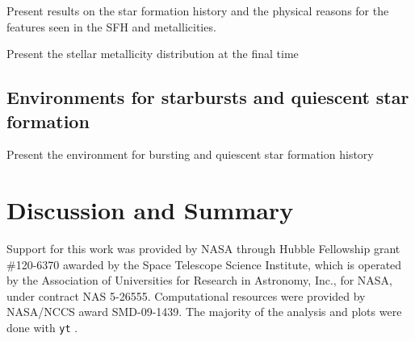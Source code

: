 \documentclass[apjl]{emulateapj}
\begin{document}
\li Present results on the star formation history and the physical
reasons for the features seen in the SFH and metallicities.

\li Present the stellar metallicity distribution at the final time

\subsection{Environments for starbursts and quiescent star formation}

\li Present the environment for bursting and quiescent star formation
history

\section{Discussion and Summary}

\acknowledgments

Support for this work was provided by NASA through Hubble Fellowship
grant \#120-6370 awarded by the Space Telescope Science Institute,
which is operated by the Association of Universities for Research in
Astronomy, Inc., for NASA, under contract NAS 5-26555.  Computational
resources were provided by NASA/NCCS award SMD-09-1439.  The majority
of the analysis and plots were done with \texttt{yt}
\citep{yt_full_paper}.

%

\end{document}
